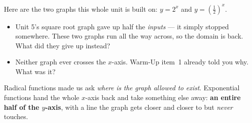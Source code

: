 \documentclass[10pt]{article}
\newcommand{\lgrid}[4]{%
  \draw[step=1, linegray!40, very thin] (#1,#3) grid (#2,#4);
  \draw[->, semithick, charcoal] (#1,0)--(#2,0) node[below right, font=\scriptsize]{$x$};
  \draw[->, semithick, charcoal] (0,#3)--(0,#4) node[left, font=\scriptsize]{$y$};}
\newcommand{\expcurve}[4]{\draw[very thick, forest, domain=#3:#4, samples=120, smooth]
  plot (\x,{#1*exp((#2)*(\x))});}
\begin{document}
\begin{hookbox}
Here are the two graphs this whole unit is built on: $y=2^{x}$ and $y=\left(\frac12\right)^{x}$.
\begin{center}
\end{center}
\begin{itemize}\setlength{\itemsep}{1pt}
  \item Unit 5's square root graph gave up half the \emph{inputs} --- it simply stopped somewhere. These two graphs run all the way across, so the domain is back. What did they give up instead? \writeline
  \item Neither graph ever crosses the $x$-axis. Warm-Up item~1 already told you why. What was it? \writeline
\end{itemize}
Radical functions made us ask \emph{where is the graph allowed to exist}. Exponential functions hand
the whole $x$-axis back and take something else away: \textbf{an entire half of the $y$-axis}, with a
line the graph gets closer and closer to but \emph{never} touches.
\end{hookbox}
\end{document}
